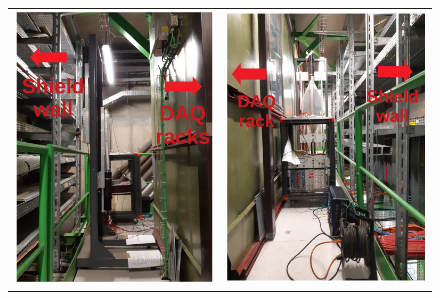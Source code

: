 \newpage
\begin{figure}[h]
  \begin{center}
    \begin{tabular}[t]{cc}
      \includegraphics[width=8.5cm]{figs/INT/Initial.pdf} &
      \includegraphics[width=8.5cm]{figs/INT/Back_central.pdf} \\

\end{tabular}
\end{center}
\end{figure}
